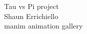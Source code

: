 \documentclass[preview]{standalone}
\begin{document}
Tau vs Pi project\\Shaun Errichiello\\manim animation gallery\\
\end{document}
